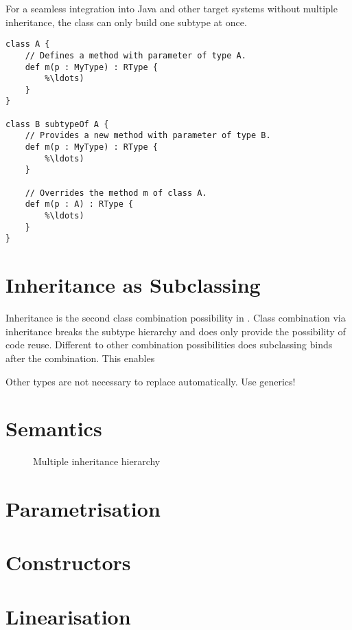 For a seamless integration into Java and other target systems without multiple
inheritance, the class can only build one subtype at once.

\begin{lstlisting}[language=ooplss,caption=Subtyping in \ooplss,label="lst:subtypeOf"]
class A {
	// Defines a method with parameter of type A.
	def m(p : MyType) : RType {
		%\ldots)
	}
}

class B subtypeOf A {
	// Provides a new method with parameter of type B.
	def m(p : MyType) : RType {
		%\ldots)
	}

	// Overrides the method m of class A.
	def m(p : A) : RType {
		%\ldots)
	}
}
\end{lstlisting}

\section{Inheritance as Subclassing}
Inheritance is the second class combination possibility in \ooplss. Class
combination via inheritance breaks the subtype hierarchy and does only
provide the possibility of code reuse.  Different to other combination
possibilities does subclassing binds \mytype after the combination. This
enables 

Other types are not necessary to replace automatically. Use generics!

\section{Semantics}
\begin{figure}
	\centering
	\caption{Multiple inheritance hierarchy}
	\label{fig:multiInherit}
\end{figure}

\section{Parametrisation}
\section{Constructors}
\section{Linearisation}



